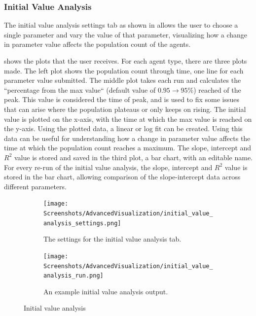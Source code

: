 \subsubsection{Initial Value Analysis}
The initial value analysis settings tab as shown in  allows the user to choose a single parameter and vary the value of that parameter, visualizing how a change in parameter value affects the population count of the agents.

 shows the plots that the user receives.
For each agent type, there are three plots made.
The left plot shows the population count through time, one line for each parameter value submitted.
The middle plot takes each run and calculates the “percentage from the max value“ (default value of $0.95 \rightarrow 95\%$) reached of the peak.
This value is considered the time of peak, and is used to fix some issues that can arise where the population plateaus or only keeps on rising.
The initial value is plotted on the x-axis, with the time at which the max value is reached on the y-axis.
Using the plotted data, a linear or log fit can be created.
Using this data can be useful for understanding how a change in parameter value affects the time at which the population count reaches a maximum.
The slope, intercept and $R^2$ value is stored and saved in the third plot, a bar chart, with an editable name.
For every re-run of the initial value analysis, the slope, intercept and $R^2$ value is stored in the bar chart, allowing comparison of the slope-intercept data across different parameters. 

\begin{figure}[h!]
    \centering
    \begin{subfigure}{0.49\linewidth}
        \centering
        \vspace*{\fill}
        \texttt{[image: Screenshots/AdvancedVisualization/initial\_value\_analysis\_settings.png]}
        \caption{
            The settings for the initial value analysis tab. 
        }
        \label{fig:ss:av:initial_value_analysis_settings}
        \vspace*{\fill}
    \end{subfigure}
    \hfill
    \begin{subfigure}{0.49\linewidth}
        \centering
        \vspace*{\fill}
        \texttt{[image: Screenshots/AdvancedVisualization/initial\_value\_analysis\_run.png]}
        \caption{
            An example initial value analysis output. 
        }
        \label{fig:ss:av:initial_value_analysis_run}
        \vspace*{\fill}
    \end{subfigure}
    \caption{Initial value analysis}
\end{figure}

